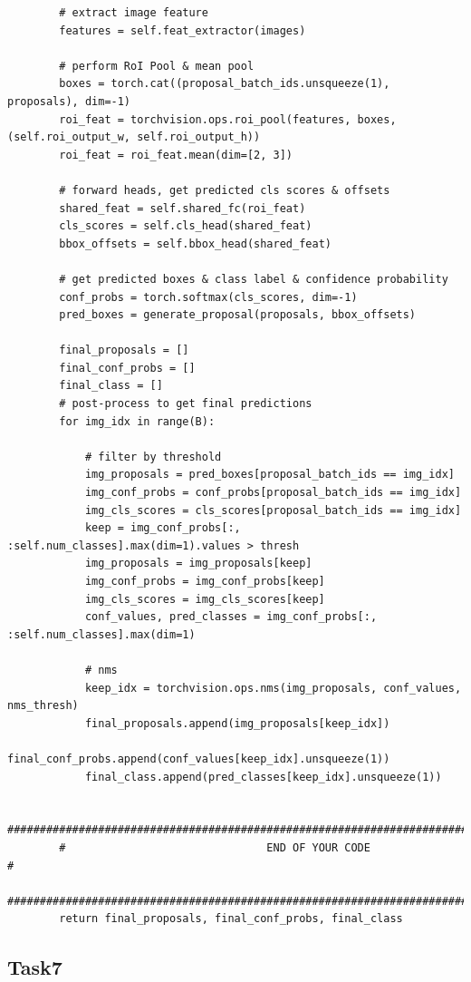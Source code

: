 \documentclass{article}%
\begin{document}
\begin{lstlisting}
        # extract image feature
        features = self.feat_extractor(images)

        # perform RoI Pool & mean pool
        boxes = torch.cat((proposal_batch_ids.unsqueeze(1), proposals), dim=-1)
        roi_feat = torchvision.ops.roi_pool(features, boxes, (self.roi_output_w, self.roi_output_h))
        roi_feat = roi_feat.mean(dim=[2, 3])

        # forward heads, get predicted cls scores & offsets
        shared_feat = self.shared_fc(roi_feat)
        cls_scores = self.cls_head(shared_feat)
        bbox_offsets = self.bbox_head(shared_feat)

        # get predicted boxes & class label & confidence probability
        conf_probs = torch.softmax(cls_scores, dim=-1)
        pred_boxes = generate_proposal(proposals, bbox_offsets)

        final_proposals = []
        final_conf_probs = []
        final_class = []
        # post-process to get final predictions
        for img_idx in range(B):

            # filter by threshold
            img_proposals = pred_boxes[proposal_batch_ids == img_idx]
            img_conf_probs = conf_probs[proposal_batch_ids == img_idx]
            img_cls_scores = cls_scores[proposal_batch_ids == img_idx]
            keep = img_conf_probs[:, :self.num_classes].max(dim=1).values > thresh
            img_proposals = img_proposals[keep]
            img_conf_probs = img_conf_probs[keep]
            img_cls_scores = img_cls_scores[keep]
            conf_values, pred_classes = img_conf_probs[:, :self.num_classes].max(dim=1)

            # nms
            keep_idx = torchvision.ops.nms(img_proposals, conf_values, nms_thresh)
            final_proposals.append(img_proposals[keep_idx])
            final_conf_probs.append(conf_values[keep_idx].unsqueeze(1))
            final_class.append(pred_classes[keep_idx].unsqueeze(1))

        ##############################################################################
        #                               END OF YOUR CODE                             #
        ##############################################################################
        return final_proposals, final_conf_probs, final_class
\end{lstlisting}

\subsection{Task7}
\end{document}
